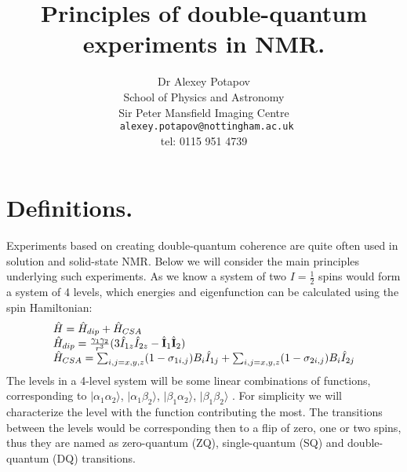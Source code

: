\documentclass[a4paper, 12pt]{article}
\begin{document}
\title{Principles of double-quantum experiments in NMR.}
\author{Dr Alexey Potapov\\
School of Physics and Astronomy\\
Sir Peter Mansfield Imaging Centre \\
\texttt{ alexey.potapov@nottingham.ac.uk}\\
tel: 0115 951 4739 }
\maketitle
 
\section{Definitions.}
Experiments based on creating double-quantum coherence are quite often used in solution and solid-state NMR. Below we will consider the main principles underlying such experiments.
As we know a system of two $I= \frac{1}{2}$ spins would form a system of 4 levels, which energies and eigenfunction can be calculated using the spin Hamiltonian:
\begin{equation}
\begin{array}{lcl}
\hat{H} = \hat{H}_{dip} + \hat{H}_{CSA} \\
\hat{H}_{dip} = \frac{\gamma_1 \gamma_2 }{r^3} (3 \hat{I}_{1z} \hat{I}_{2z} -  \hat{\bf{I}}_1 \hat{\bf{I}}_2) \\
\hat{H}_{CSA} = \sum_{i,j = x,y,z} (1 - \sigma_{1i,j}) B_i \hat{I}_{1j}  +  \sum_{i,j = x,y,z} (1- \sigma_{2i,j} ) B_i \hat{I}_{2j}
\end{array}
\end{equation}
The levels in a 4-level system will be some linear combinations of functions, corresponding to $\vert \alpha_1 \alpha_2  \rangle$, $\vert \alpha_1 \beta_2  \rangle$, $\vert \beta_1 \alpha_2  \rangle$, $\vert \beta_1 \beta_2  \rangle$ . For simplicity we will characterize the level with the function contributing the most. The transitions between the levels would be corresponding then to a flip of zero, one or two spins, thus they are named as zero-quantum (ZQ), single-quantum (SQ) and double-quantum (DQ) transitions.
\end{document}
